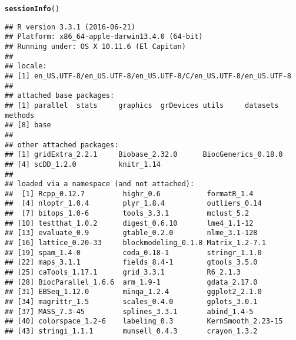 \documentclass{article}\usepackage[]{graphicx}\usepackage[]{color}
\makeatletter
\newcommand{\hlstd}[1]{\textcolor[rgb]{0.345,0.345,0.345}{#1}}%
\newcommand{\hlkwd}[1]{\textcolor[rgb]{0.737,0.353,0.396}{\textbf{#1}}}%
\newenvironment{kframe}{%
 \def\at@end@of@kframe{}%
 \ifinner\ifhmode%
  \def\at@end@of@kframe{\end{minipage}}%
  \begin{minipage}{\columnwidth}%
 \fi\fi%
 \def\FrameCommand##1{\hskip\@totalleftmargin \hskip-\fboxsep
 \colorbox{shadecolor}{##1}\hskip-\fboxsep
     \hskip-\linewidth \hskip-\@totalleftmargin \hskip\columnwidth}%
 \MakeFramed {\advance\hsize-\width
   \@totalleftmargin\z@ \linewidth\hsize
   \@setminipage}}%
 {\par\unskip\endMakeFramed%
 \at@end@of@kframe}
\newenvironment{knitrout}{}{} %
\makeatother
\begin{document}
\begin{knitrout}
\color{fgcolor}\begin{kframe}
\begin{alltt}
\hlkwd{sessionInfo}\hlstd{()}
\end{alltt}
\begin{verbatim}
## R version 3.3.1 (2016-06-21)
## Platform: x86_64-apple-darwin13.4.0 (64-bit)
## Running under: OS X 10.11.6 (El Capitan)
## 
## locale:
## [1] en_US.UTF-8/en_US.UTF-8/en_US.UTF-8/C/en_US.UTF-8/en_US.UTF-8
## 
## attached base packages:
## [1] parallel  stats     graphics  grDevices utils     datasets  methods  
## [8] base     
## 
## other attached packages:
## [1] gridExtra_2.2.1     Biobase_2.32.0      BiocGenerics_0.18.0
## [4] scDD_1.2.0          knitr_1.14         
## 
## loaded via a namespace (and not attached):
##  [1] Rcpp_0.12.7         highr_0.6           formatR_1.4        
##  [4] nloptr_1.0.4        plyr_1.8.4          outliers_0.14      
##  [7] bitops_1.0-6        tools_3.3.1         mclust_5.2         
## [10] testthat_1.0.2      digest_0.6.10       lme4_1.1-12        
## [13] evaluate_0.9        gtable_0.2.0        nlme_3.1-128       
## [16] lattice_0.20-33     blockmodeling_0.1.8 Matrix_1.2-7.1     
## [19] spam_1.4-0          coda_0.18-1         stringr_1.1.0      
## [22] maps_3.1.1          fields_8.4-1        gtools_3.5.0       
## [25] caTools_1.17.1      grid_3.3.1          R6_2.1.3           
## [28] BiocParallel_1.6.6  arm_1.9-1           gdata_2.17.0       
## [31] EBSeq_1.12.0        minqa_1.2.4         ggplot2_2.1.0      
## [34] magrittr_1.5        scales_0.4.0        gplots_3.0.1       
## [37] MASS_7.3-45         splines_3.3.1       abind_1.4-5        
## [40] colorspace_1.2-6    labeling_0.3        KernSmooth_2.23-15 
## [43] stringi_1.1.1       munsell_0.4.3       crayon_1.3.2
\end{verbatim}
\end{kframe}
\end{knitrout}


\end{document}
